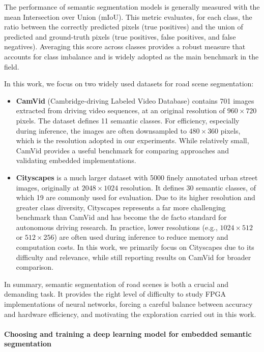 \documentclass[11pt]{report}
\begin{document}
The performance of semantic segmentation models is generally measured with the mean Intersection over Union (mIoU). This metric evaluates, for each class, the ratio between the correctly predicted pixels (true positives) and the union of predicted and ground-truth pixels (true positives, false positives, and false negatives). Averaging this score across classes provides a robust measure that accounts for class imbalance and is widely adopted as the main benchmark in the field.

In this work, we focus on two widely used datasets for road scene segmentation:

\begin{itemize}
  \item \textbf{CamVid} (Cambridge-driving Labeled Video Database) contains 701 images extracted from driving video sequences, at an original resolution of $960\times720$ pixels. The dataset defines 11 semantic classes. For efficiency, especially during inference, the images are often downsampled to $480\times360$ pixels, which is the resolution adopted in our experiments. While relatively small, CamVid provides a useful benchmark for comparing approaches and validating embedded implementations.

  \item \textbf{Cityscapes} is a much larger dataset with 5000 finely annotated urban street images, originally at $2048\times1024$ resolution. It defines 30 semantic classes, of which 19 are commonly used for evaluation. Due to its higher resolution and greater class diversity, Cityscapes represents a far more challenging benchmark than CamVid and has become the de facto standard for autonomous driving research. In practice, lower resolutions (e.g., $1024\times512$ or $512\times256$) are often used during inference to reduce memory and computation costs. In this work, we primarily focus on Cityscapes due to its difficulty and relevance, while still reporting results on CamVid for broader comparison.
\end{itemize}

In summary, semantic segmentation of road scenes is both a crucial and demanding task. It provides the right level of difficulty to study FPGA implementations of neural networks, forcing a careful balance between accuracy and hardware efficiency, and motivating the exploration carried out in this work.


\paragraph{Choosing and training a deep learning model for embedded semantic segmentation}
\end{document}
